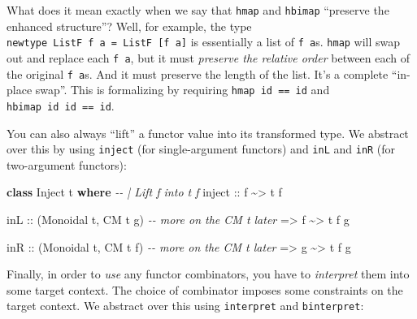 \documentclass[]{article}
\newenvironment{Shaded}{}{}
\newcommand{\CommentTok}[1]{\textcolor[rgb]{0.38,0.63,0.69}{\textit{#1}}}
\newcommand{\DataTypeTok}[1]{\textcolor[rgb]{0.56,0.13,0.00}{#1}}
\newcommand{\KeywordTok}[1]{\textcolor[rgb]{0.00,0.44,0.13}{\textbf{#1}}}
\newcommand{\NormalTok}[1]{#1}
\newcommand{\OperatorTok}[1]{\textcolor[rgb]{0.40,0.40,0.40}{#1}}
\newcommand{\OtherTok}[1]{\textcolor[rgb]{0.00,0.44,0.13}{#1}}
\begin{document}
What does it mean exactly when we say that \texttt{hmap} and \texttt{hbimap}
``preserve the enhanced structure''? Well, for example, the type
\texttt{newtype\ ListF\ f\ a\ =\ ListF\ {[}f\ a{]}} is essentially a list of
\texttt{f\ a}s. \texttt{hmap} will swap out and replace each \texttt{f\ a}, but
it must \emph{preserve the relative order} between each of the original
\texttt{f\ a}s. And it must preserve the length of the list. It's a complete
``in-place swap''. This is formalizing by requiring \texttt{hmap\ id\ ==\ id}
and \texttt{hbimap\ id\ id\ ==\ id}.

You can also always ``lift'' a functor value into its transformed type. We
abstract over this by using \texttt{inject} (for single-argument functors) and
\texttt{inL} and \texttt{inR} (for two-argument functors):

\begin{Shaded}
\begin{Highlighting}[]
\KeywordTok{class} \DataTypeTok{Inject}\NormalTok{ t }\KeywordTok{where}
    \CommentTok{{-}{-} | Lift \textasciigrave{}f\textasciigrave{} into \textasciigrave{}t f\textasciigrave{}}
\OtherTok{    inject ::}\NormalTok{ f }\OperatorTok{\textasciitilde{}>}\NormalTok{ t f}

\OtherTok{inL ::}\NormalTok{ (}\DataTypeTok{Monoidal}\NormalTok{ t, }\DataTypeTok{CM}\NormalTok{ t g)     }\CommentTok{{-}{-} more on the \textasciigrave{}CM t\textasciigrave{} later}
    \OtherTok{=>}\NormalTok{ f }\OperatorTok{\textasciitilde{}>}\NormalTok{ t f g}

\OtherTok{inR ::}\NormalTok{ (}\DataTypeTok{Monoidal}\NormalTok{ t, }\DataTypeTok{CM}\NormalTok{ t f)     }\CommentTok{{-}{-} more on the \textasciigrave{}CM t\textasciigrave{} later}
    \OtherTok{=>}\NormalTok{ g }\OperatorTok{\textasciitilde{}>}\NormalTok{ t f g}
\end{Highlighting}
\end{Shaded}

Finally, in order to \emph{use} any functor combinators, you have to
\emph{interpret} them into some target context. The choice of combinator imposes
some constraints on the target context. We abstract over this using
\texttt{interpret} and \texttt{binterpret}:
\end{document}

